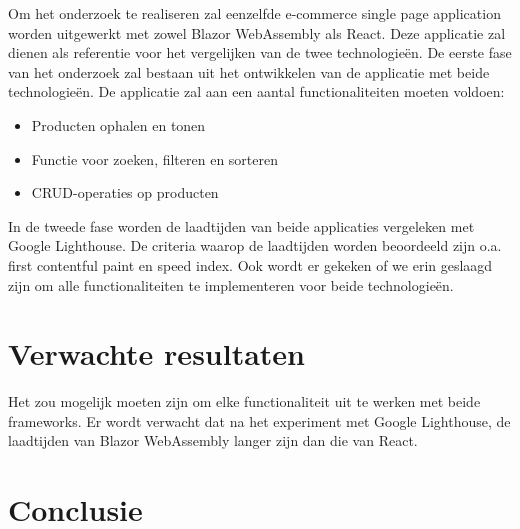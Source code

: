 \documentclass{hogent-article}
\begin{document}
Om het onderzoek te realiseren zal eenzelfde e-commerce single page application worden uitgewerkt met zowel Blazor WebAssembly als React. Deze applicatie zal dienen als referentie voor het vergelijken van de twee technologieën.
\newline\newline
De eerste fase van het onderzoek zal bestaan uit het ontwikkelen van de applicatie met beide technologieën. De applicatie zal aan een aantal functionaliteiten moeten voldoen:

\begin{itemize}
    \item Producten ophalen en tonen
    \item Functie voor zoeken, filteren en sorteren
    \item CRUD-operaties op producten
\end{itemize}

In de tweede fase worden de laadtijden van beide applicaties vergeleken met Google Lighthouse. De criteria waarop de laadtijden worden beoordeeld zijn o.a. first contentful paint en speed index. Ook wordt er gekeken of we erin geslaagd zijn om alle functionaliteiten te implementeren voor beide technologieën.

\section{Verwachte resultaten}%
\label{sec:verwachte-resultaten}


Het zou mogelijk moeten zijn om elke functionaliteit uit te werken met beide frameworks. Er wordt verwacht dat na het experiment met Google Lighthouse, de laadtijden van Blazor WebAssembly langer zijn dan die van React.

\section{Conclusie}%
\label{sec:discussie-conclusie}

\lipsum[19-21]


\printbibliography[heading=bibintoc]
\end{document}
